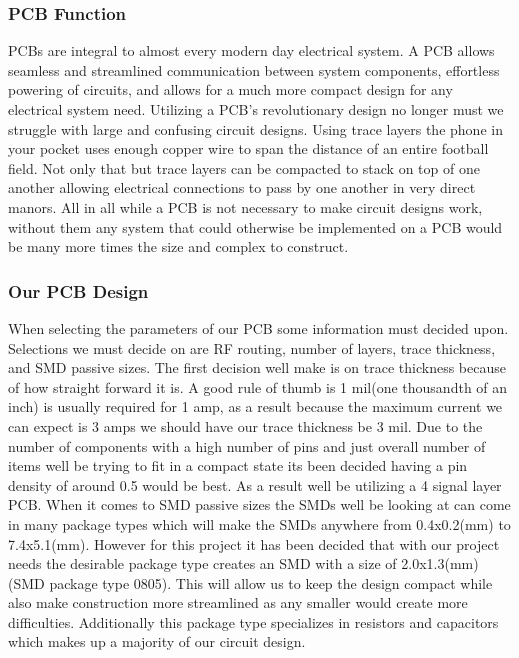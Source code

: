 \subsubsection{PCB Function}
PCBs are integral to almost every modern day electrical system. A PCB allows seamless and streamlined communication between system components, effortless powering of circuits, and allows for a much more compact design for any electrical system need. Utilizing a PCB's revolutionary design no longer must we struggle with large and confusing circuit designs. Using trace layers the phone in your pocket uses enough copper wire to span the distance of an entire football field. Not only that but trace layers can be compacted to stack on top of one another allowing electrical connections to pass by one another in very direct manors. All in all while a PCB is not necessary to make circuit designs work, without them any system that could otherwise be implemented on a PCB would be many more times the size and complex to construct.

\subsubsection{Our PCB Design}
When selecting the parameters of our PCB some information must decided upon. Selections we must decide on are RF routing, number of layers, trace thickness, and SMD passive sizes. The first decision well make is on trace thickness because of how straight forward it is. A good rule of thumb is 1 mil(one thousandth of an inch) is usually required for 1 amp, as a result because the maximum current we can expect is 3 amps we should have our trace thickness be 3 mil. Due to the number of components with a high number of pins and just overall number of items well be trying to fit in a compact state its been decided having a pin density of around 0.5 would be best. As a result well be utilizing a 4 signal layer PCB. When it comes to SMD passive sizes the SMDs well be looking at can come in many package types which will make the SMDs anywhere from 0.4x0.2(mm) to 7.4x5.1(mm). However for this project it has been decided that with our project needs the desirable package type creates an SMD with a size of 2.0x1.3(mm)(SMD package type 0805). This will allow us to keep the design compact while also make construction more streamlined as any smaller would create more difficulties. Additionally this package type specializes in resistors and capacitors which makes up a majority of our circuit design.


